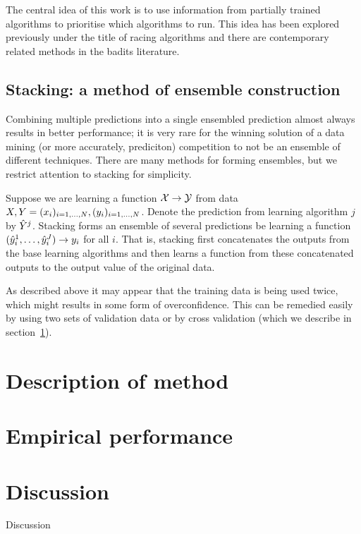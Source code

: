 \documentclass{article} %
\begin{document}
The central idea of this work is to use information from partially trained algorithms to prioritise which algorithms to run.
This idea has been explored previously under the title of racing algorithms and there are contemporary related methods in the badits literature.

\subsection{Stacking: a method of ensemble construction}

Combining multiple predictions into a single ensembled prediction almost always results in better performance; it is very rare for the winning solution of a data mining (or more accurately, prediciton) competition to not be an ensemble of different techniques.
There are many methods for forming ensembles, but we restrict attention to stacking for simplicity.

Suppose we are learning a function $\mathcal{X} \to \mathcal{Y}$ from data $X, Y = (x_i)_{i=1,\dots,N}, (y_i)_{i=1,\dots,N}$.
Denote the prediction\footnotemark{} from learning algorithm $j$ by $\hat{Y}^j$.
Stacking forms an ensemble of several predictions be learning a function $(\hat{y}_i^1,\dots,\hat{y}_i^J) \to y_i$ for all $i$.
That is, stacking first concatenates the outputs from the base learning algorithms and then learns a function from these concatenated outputs to the output value of the original data.


As described above it may appear that the training data is being used twice, which might results in some form of overconfidence.
This can be remedied easily by using two sets of validation data or by cross validation (which we describe in section~\ref{sec:method}).

\section{Description of method}
\label{sec:method}

\section{Empirical performance}

\section{Discussion}

Discussion


\small



\end{document}
